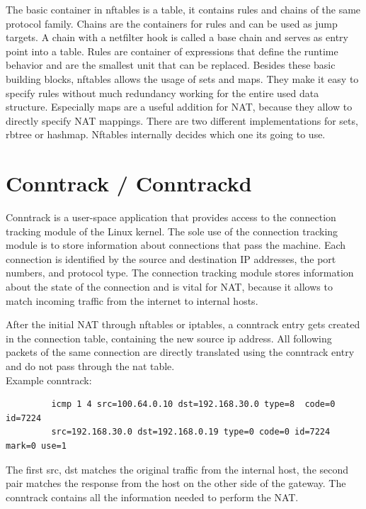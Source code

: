 \documentclass{report}
\begin{document}
The basic container in nftables is a table, it contains rules and chains
of the same protocol family. Chains are the containers for rules and can
be used as jump targets. A chain with a netfilter hook is
called a base chain and serves as entry point into a table. Rules are
container of expressions that define the runtime behavior and are the
smallest unit that can be replaced. Besides these basic building blocks,
nftables allows the usage of sets and maps. They make it easy to specify
rules without much redundancy working for the entire used data structure.
Especially maps are a useful addition for NAT, because they allow to
directly specify NAT mappings. There are two different implementations
for sets, rbtree or hashmap. Nftables internally decides which one its
going to use.

\section{Conntrack / Conntrackd}\label{conntrack-conntrackd}

Conntrack\cite{conntrack-tools} is a user-space application that provides access to the
connection tracking module\cite{conntrackSys} of the Linux kernel. The sole use of the
connection tracking module is to store information about connections
that pass the machine. Each connection is identified by the source and
destination IP addresses, the port numbers, and protocol type. The
connection tracking module stores information about the state of the
connection and is vital for NAT, because it allows to match incoming
traffic from the internet to internal hosts.

After the initial NAT through nftables or iptables, a conntrack entry gets
created in the connection table, containing the new source ip address.
All following packets of the same connection are directly translated
using the conntrack entry and do not pass through the nat table. \\

Example conntrack:


\begin{verbatim}
         icmp 1 4 src=100.64.0.10 dst=192.168.30.0 type=8  code=0 id=7224
         src=192.168.30.0 dst=192.168.0.19 type=0 code=0 id=7224 mark=0 use=1
\end{verbatim}

The first src, dst matches the original traffic from the internal host,
the second pair matches the response from the host on the other side of
the gateway. The conntrack contains all the information needed to
perform the NAT.
\end{document}
